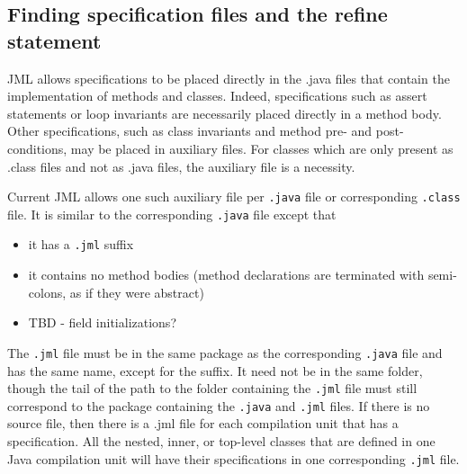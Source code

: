 \subsection{Finding specification files and the refine statement}

JML allows specifications to be placed directly in the .java files that contain the implementation of methods and
classes. Indeed, specifications such as assert statements or loop invariants are necessarily placed directly in
a method body. Other specifications, such as class invariants and method pre- and post-conditions, may be placed in
auxiliary files. For classes which are only present as .class files and not as .java files, the auxiliary file is
a necessity.

Current JML allows one such auxiliary file per \texttt{.java} file or corresponding \texttt{.class} file. It is similar to the corresponding \texttt{.java} file except that
\begin{itemize} \nospace
\item it has a \texttt{.jml} suffix
\item it contains no method bodies (method declarations are terminated with semi-colons, as if they were abstract)
\item TBD - field initializations?
\end{itemize}
The \texttt{.jml} file must be in the same package as the corresponding \texttt{.java} file and has the same name, except for the suffix. It need not be in the same folder, though the tail of the path to the folder containing the \texttt{.jml} file must still correspond to the package containing the \texttt{.java} and \texttt{.jml} files.
If there is no source file, then there is a .jml file for each compilation unit that has a specification. All the nested, inner, or top-level classes that are defined in one Java compilation unit will have their specifications in one corresponding \texttt{.jml} file.

